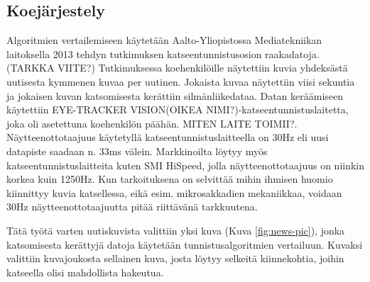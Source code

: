 \subsection{Koejärjestely}
Algoritmien vertailemiseen käytetään Aalto-Yliopistossa Mediatekniikan laitoksella 2013 tehdyn tutkimuksen katseentunnistusosion raakadatoja.(TARKKA VIITE?) Tutkimuksessa koehenkilöille näytettiin kuvia yhdeksästä uutisesta kymmenen kuvaa per uutinen. Jokaista kuvaa näytettiin viisi sekuntia ja jokaisen kuvan katsomisesta kerättiin silmänliikedataa. Datan keräämiseen käytettiin EYE-TRACKER VISION(OIKEA NIMI?)-katseentunnistuslaitetta, joka oli asetettuna koehenkilön päähän. MITEN LAITE TOIMII?. Näytteenottotaajuus käytetyllä katseentunnistuslaitteella on 30Hz eli uusi datapiste saadaan n. 33ms välein. Markkinoilta löytyy myös katseentunnistuslaitteita kuten SMI HiSpeed, jolla näytteenottotaajuus on niinkin korkea kuin 1250Hz.\citep[s.197]{nystrom2010} Kun tarkoituksena on selvittää mihin ihmisen huomio kiinnittyy kuvia katsellessa, eikä esim. mikrosakkadien mekaniikkaa, voidaan 30Hz näytteenottotaajuutta pitää riittävänä tarkkuutena.

Tätä työtä varten uutiskuvista valittiin yksi kuva (Kuva \ref{fig:news-pic}), jonka katsomisesta kerättyjä datoja käytetään tunnistusalgoritmien vertailuun. Kuvaksi valittiin kuvajoukosta sellainen kuva, josta löytyy selkeitä kiinnekohtia, joihin katseella olisi mahdollista hakeutua. 


